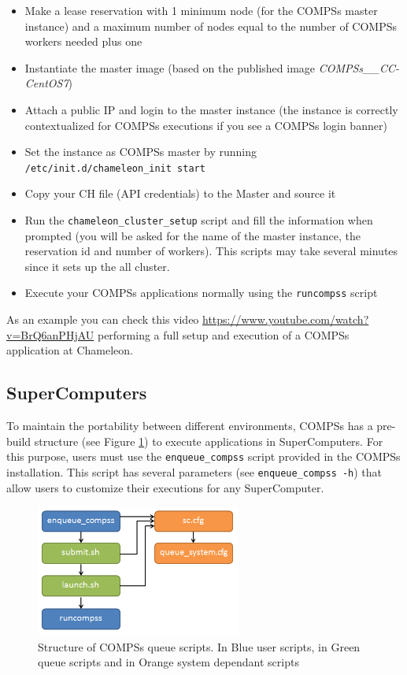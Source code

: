 \begin{itemize}
 \item Make a lease reservation with 1 minimum node (for the COMPSs master instance) and a maximum number of nodes equal to the
 number of COMPSs workers needed plus one
 \item Instantiate the master image (based on the published image \textit{COMPSs\_\compssversion\_CC-CentOS7})
 \item Attach a public IP and login to the master instance (the instance is correctly contextualized for COMPSs executions if you
 see a COMPSs login banner)
 \item Set the instance as COMPSs master by running \texttt{/etc/init.d/chameleon\_init start}
 \item Copy your CH file (API credentials) to the Master and source it
 \item Run the \texttt{chameleon\_cluster\_setup} script and fill the information when prompted (you will be asked for the name of the
 master instance, the reservation id and number of workers). This scripts may take several minutes since it sets up the all cluster.
 \item Execute your COMPSs applications normally using the \texttt{runcompss} script
\end{itemize}

As an example you can check this video \url{https://www.youtube.com/watch?v=BrQ6anPHjAU} performing a full setup and 
execution of a COMPSs application at Chameleon.


\subsection{SuperComputers}

To maintain the portability between different environments, COMPSs has a pre-build structure (see Figure 
\ref{fig:queue_scripts_structure}) to execute applications in SuperComputers. For this purpose, users must use 
the \texttt{enqueue\_compss} script provided in the COMPSs installation. This script has several parameters (see 
\texttt{enqueue\_compss -h}) that allow users to customize their executions for any SuperComputer.

\begin{figure}[!ht]
  \centering
    \includegraphics[width=0.6\textwidth]{./Sections/5_Execution_Platforms/Figures/queue_scripts_structure.png}
    \caption{Structure of COMPSs queue scripts. In Blue user scripts, in Green queue scripts and in Orange system dependant scripts}
    \label{fig:queue_scripts_structure}
\end{figure}

